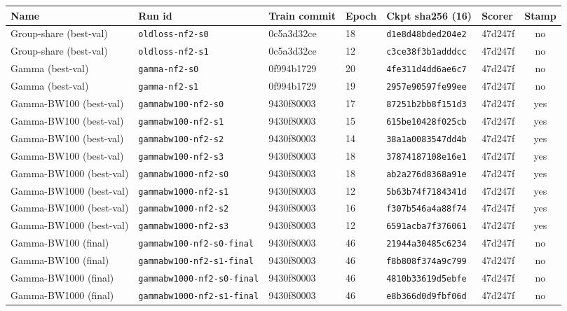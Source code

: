 \begin{tabular}{llllllc}
\toprule
Name & Run id & Train commit & Epoch & Ckpt sha256 (16) & Scorer & Stamp \\
\midrule
Group-share (best-val) & \texttt{oldloss-nf2-s0} & 0c5a3d32ce & 18 & \texttt{d1e8d48bded204e2} & 47d247f & no \\
Group-share (best-val) & \texttt{oldloss-nf2-s1} & 0c5a3d32ce & 12 & \texttt{c3ce38f3b1adddcc} & 47d247f & no \\
Gamma (best-val) & \texttt{gamma-nf2-s0} & 0f994b1729 & 20 & \texttt{4fe311d4dd6ae6c7} & 47d247f & no \\
Gamma (best-val) & \texttt{gamma-nf2-s1} & 0f994b1729 & 19 & \texttt{2957e90597fe99ee} & 47d247f & no \\
Gamma-BW100 (best-val) & \texttt{gammabw100-nf2-s0} & 9430f80003 & 17 & \texttt{87251b2bb8f151d3} & 47d247f & yes \\
Gamma-BW100 (best-val) & \texttt{gammabw100-nf2-s1} & 9430f80003 & 15 & \texttt{615be10428f025cb} & 47d247f & yes \\
Gamma-BW100 (best-val) & \texttt{gammabw100-nf2-s2} & 9430f80003 & 14 & \texttt{38a1a0083547dd4b} & 47d247f & yes \\
Gamma-BW100 (best-val) & \texttt{gammabw100-nf2-s3} & 9430f80003 & 18 & \texttt{37874187108e16e1} & 47d247f & yes \\
Gamma-BW1000 (best-val) & \texttt{gammabw1000-nf2-s0} & 9430f80003 & 18 & \texttt{ab2a276d8368a91e} & 47d247f & yes \\
Gamma-BW1000 (best-val) & \texttt{gammabw1000-nf2-s1} & 9430f80003 & 12 & \texttt{5b63b74f7184341d} & 47d247f & yes \\
Gamma-BW1000 (best-val) & \texttt{gammabw1000-nf2-s2} & 9430f80003 & 16 & \texttt{f307b546a4a88f74} & 47d247f & yes \\
Gamma-BW1000 (best-val) & \texttt{gammabw1000-nf2-s3} & 9430f80003 & 12 & \texttt{6591acba7f376061} & 47d247f & yes \\
Gamma-BW100 (final) & \texttt{gammabw100-nf2-s0-final} & 9430f80003 & 46 & \texttt{21944a30485c6234} & 47d247f & no \\
Gamma-BW100 (final) & \texttt{gammabw100-nf2-s1-final} & 9430f80003 & 46 & \texttt{f8b808f374a9c799} & 47d247f & no \\
Gamma-BW1000 (final) & \texttt{gammabw1000-nf2-s0-final} & 9430f80003 & 46 & \texttt{4810b33619d5ebfe} & 47d247f & no \\
Gamma-BW1000 (final) & \texttt{gammabw1000-nf2-s1-final} & 9430f80003 & 46 & \texttt{e8b366d0d9fbf06d} & 47d247f & no \\

\end{tabular}
